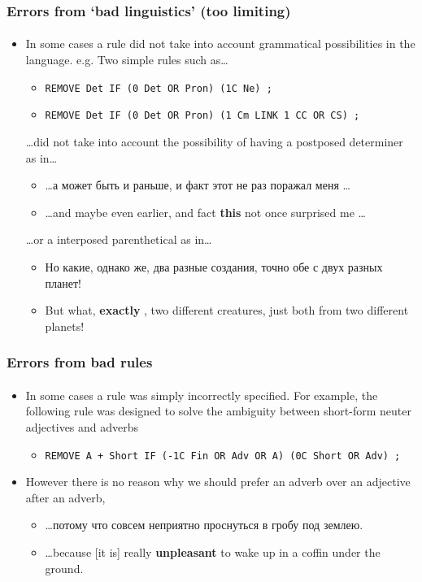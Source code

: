 \documentclass{beamer}
\newcommand{\rus}[1]{\foreignlanguage{russian}{#1}}
\begin{document}
\begin{frame}
\frametitle{Errors from `bad linguistics' (too limiting)}
\framesubtitle{}
\begin{itemize}
	  \item In some cases a rule did not take into account grammatical possibilities 
    in the language. e.g. Two simple rules such as\ldots
    \begin{itemize}
      \item \texttt{REMOVE Det IF (0 Det OR Pron) (1C Ne) ;}
      \item \texttt{REMOVE Det IF (0 Det OR Pron) (1 Cm LINK 1 CC OR CS) ;}
    \end{itemize}
    \ldots did not take into account the possibility of having a postposed determiner as in\ldots
    \begin{itemize}
      \item \ldots \rus{а может быть и раньше, и факт этот не раз поражал меня} \ldots
      \item \ldots and maybe even earlier, and fact \textbf{this} not once surprised me \ldots
    \end{itemize}
    \ldots or a interposed parenthetical as in\ldots
    \begin{itemize}
      \item \rus{Но какие, однако же, два разные создания, точно обе с двух разных планет!}
      \item But what, \textbf{exactly} , two different creatures, just both from two different planets!
    \end{itemize}
\end{itemize}
\end{frame}

\begin{frame}
\frametitle{Errors from bad rules}
\framesubtitle{}
\begin{itemize}
	\item In some cases a rule was simply incorrectly specified. For example, the 
	following rule was designed to solve the ambiguity between short-form neuter adjectives and 
	adverbs
   \begin{itemize}
		\item \texttt{REMOVE A + Short IF (-1C Fin OR Adv OR A) (0C Short OR Adv) ;}
   \end{itemize}
   \item However there is no reason why we should prefer an adverb over an adjective after an adverb, 
   \begin{itemize}
     \item \ldots \rus{потому что совсем неприятно проснуться в гробу под землею.}
     \item \ldots because [it is] really \textbf{unpleasant} to wake up in a coffin under the ground.
   \end{itemize}
\end{itemize}
\end{frame}
\end{document}
